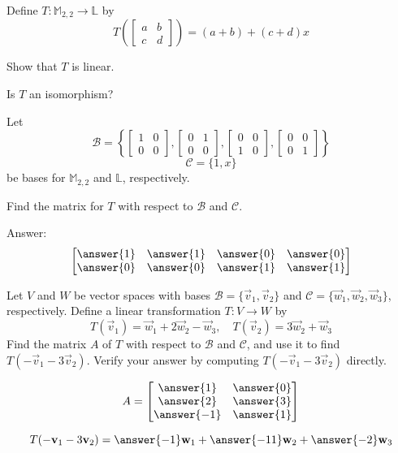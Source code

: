 \documentclass{ximera}
\begin{document}
\begin{problem}
Define $T:\mathbb{M}_{2,2}\rightarrow \mathbb{L}$ by 
$$T\left(\begin{bmatrix}a&b\\c&d\end{bmatrix}\right)=(a+b)+(c+d)x$$

\begin{problem}\label{prob:m22tolpart1}
Show that $T$ is linear.
\end{problem}

\begin{problem}\label{prob:m22tolpart2}
Is $T$ an isomorphism? 
\end{problem}

\begin{problem}\label{prob:m22tolpart3}
Let
$$\mathcal{B}=\left\{\begin{bmatrix}1&0\\0&0\end{bmatrix}, \begin{bmatrix}0&1\\0&0\end{bmatrix}, \begin{bmatrix}0&0\\1&0\end{bmatrix}, \begin{bmatrix}0&0\\0&1\end{bmatrix}\right\}$$
$$\mathcal{C}=\{1, x\}$$
be bases for $\mathbb{M}_{2,2}$ and $\mathbb{L}$, respectively.

Find the matrix for $T$ with respect to $\mathcal{B}$ and $\mathcal{C}$.

Answer:
$$\begin{bmatrix}\answer{1}&\answer{1}&\answer{0}&\answer{0}\\\answer{0}&\answer{0}&\answer{1}&\answer{1}\end{bmatrix}$$

\end{problem}
\end{problem}

\begin{problem}\label{prob:matlintransabstract1}
Let $V$ and $W$ be vector spaces with bases $\mathcal{B}=\{\vec{v}_1, \vec{v}_2\}$ and $\mathcal{C}=\{\vec{w}_1, \vec{w}_2, \vec{w}_3\}$, respectively.  Define a linear transformation $T:V\rightarrow W$ by $$T(\vec{v}_1)=\vec{w}_1+2\vec{w}_2-\vec{w}_3,\quad T(\vec{v}_2)=3\vec{w}_2+\vec{w}_3$$
Find the matrix $A$ of $T$ with respect to $\mathcal{B}$ and $\mathcal{C}$, and use it to find $T(-\vec{v}_1-3\vec{v}_2)$.  Verify your answer by computing $T(-\vec{v}_1-3\vec{v}_2)$ directly.

$$A=\begin{bmatrix}\answer{1}&\answer{0}\\\answer{2}&\answer{3}\\\answer{-1}&\answer{1}\end{bmatrix}$$

$$T(-\vec{v}_1-3\vec{v}_2)=\answer{-1}\vec{w}_1+\answer{-11}\vec{w}_2+\answer{-2}\vec{w}_3$$
\end{problem}
\end{document}
